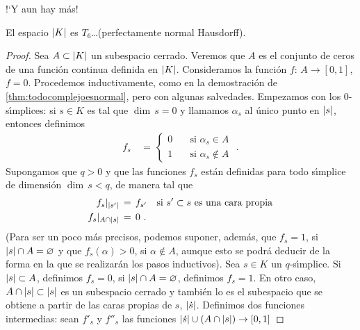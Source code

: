 !`Y aun hay m\'{a}s!

\begin{coroTodoComplejoEsPerfectamenteNormal}%
	\label{thm:todocomplejoesperfectamentenormal}
	El espacio $\left|K\right|$ es $T_{6}$\dots (perfectamente normal Hausdorff).
\end{coroTodoComplejoEsPerfectamenteNormal}

\begin{proof}
	Sea $A\subset\left|K\right|$ un subespacio cerrado. Veremos que $A$ es el
	conjunto de ceros de una funci\'{o}n continua definida en $\left|K\right|$.
	Consideramos la funci\'{o}n $f:\,A\rightarrow [0,1]$, $f=0$.
	Procedemos inductivamente, como en la demostraci\'{o}n de
	\ref{thm:todocomplejoesnormal}, pero con algunas salvedades.
	Empezamos con los $0$-s\'{\i}mplices: si $s\in K$ es tal que
	$\dim\,s=0$ y llamamos $\alpha_{s}$ al \'{u}nico punto en $\left|s\right|$,
	entonces definimos
	\begin{align*}
		f_{s} & \,=\,
			\begin{cases}
				0 & \quad\text{si } \alpha_{s}\in A \\
				1 & \quad\text{si } \alpha_{s}\not\in A
			\end{cases}
		\text{ .}
	\end{align*}
	Supongamos que $q>0$ y que las funciones $f_{s}$ est\'{a}n definidas
	para todo s\'{\i}mplice de dimensi\'{o}n $\dim\,s<q$, de manera tal
	que
	\begin{equation}
		\label{eq:todocomplejoesperfectamentenormal}
		\begin{aligned}
			f_{s}|_{\geom{s'}} & \,=\,f_{s'}
				\quad\text{si } s'\subset s\text{ es una %
				cara propia} \\
			f_{s}|_{A\cap\geom{s}} & \,=\,0
			\text{ .}
		\end{aligned}
	\end{equation}
	(Para ser un poco m\'{a}s precisos, podemos suponer, adem\'{a}s, que
	$f_{s}=1$, si $\left|s\right|\cap A=\varnothing$ y que $f_{s}(\alpha)>0$,
	si $\alpha\not\in A$, aunque esto se podr\'{a} deducir de la forma
	en la que se realizar\'{a}n los pasos inductivos).
	Sea $s\in K$ un $q$-s\'{\i}mplice. Si $\left|s\right|\subset A$,
	definimos $f_{s}=0$, si $\left|s\right|\cap A=\varnothing$, definimos
	$f_{s}=1$. En otro caso, $A\cap\left|s\right|\subset\left|s\right|$ es un
	subespacio cerrado y tambi\'{e}n lo es el subespacio que se
	obtiene a partir de las caras propias de $s$, $\left|\dot{s}\right|$.
	Definimos dos funciones intermedias: sean $f'_{s}$ y $f''_{s}$ las
	funciones $\left|\dot{s}\right|\cup(A\cap\left|s\right|)\rightarrow [0,1]$

\end{proof}
